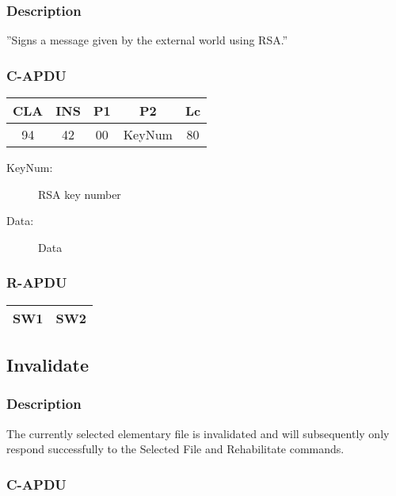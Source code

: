 \documentclass[a4paper,oneside]{article}
\begin{document}
\subsubsection*{Description}

''Signs a message given by the external world using RSA.''

\subsubsection*{C-APDU}

\begin{tabular}{|c|c|c|c|c|} \hline
CLA & INS & P1 & P2 & Lc \\ \hline \hline
94 & 42 & 00 & KeyNum & 80 \\ \hline
\end{tabular}

\begin{description}
\item[KeyNum:] RSA key number
\item[Data:] Data
\end{description}

\subsubsection*{R-APDU}

\begin{tabular}{|c|c|} \hline
SW1 & SW2 \\ \hline
\end{tabular}


\subsection{Invalidate}

\subsubsection*{Description}

The currently selected elementary file is invalidated and will
subsequently only respond successfully to the Selected File and
Rehabilitate commands.

\subsubsection*{C-APDU}
\end{document}
